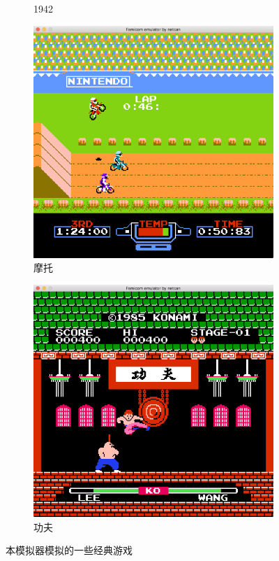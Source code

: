 \documentclass[a4paper]{ltxdoc}
\begin{document}
{\begin{figure}[h]
\begin{subfigure}[b]{0.49\textwidth}
			\caption{1942}
		\end{subfigure}
		\begin{subfigure}[b]{0.49\textwidth}
			\includegraphics[width=\textwidth]{images/Excitebike.png}
			\caption{摩托}
		\end{subfigure}
		\begin{subfigure}[b]{0.49\textwidth}
			\includegraphics[width=\textwidth]{images/功夫.png}
			\caption{功夫}
		\end{subfigure}
		\caption{本模拟器模拟的一些经典游戏}
		\label{fig:goal}
\end{figure}

}
\end{document}
